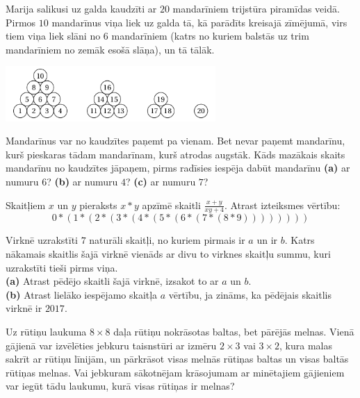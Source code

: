 \documentclass[11pt]{article}
\begin{document}
\begin{problem}[EE.PK.2011.7.TEST.10]
Marija salikusi uz galda kaudzīti ar $20$ mandarīniem trijstūra 
piramīdas veidā. Pirmos $10$ mandarīnus viņa liek uz galda tā, 
kā parādīts kreisajā zīmējumā, virs tiem viņa liek slāni no $6$ 
mandarīniem (katrs no kuriem balstās uz trim mandarīniem no zemāk
esošā slāņa), un tā tālāk. 
\begin{center}
\includegraphics[width=0.6\textwidth]{math-induction-junior-classes/EE-PK-2011-7-TEST-10.png}
\end{center}
Mandarīnus var no kaudzītes paņemt pa vienam. Bet nevar paņemt mandarīnu, kurš
pieskaras tādam mandarīnam, kurš atrodas augstāk. Kāds mazākais skaits mandarīnu 
no kaudzītes jāpaņem, pirms radīsies iespēja dabūt mandarīnu 
{\bf (a)} ar numuru $6$? 
{\bf (b)} ar numuru $4$? 
{\bf (c)} ar numuru $7$?
\end{problem}


\begin{problem}[EE.PK.2011.9.3]
Skaitļiem $x$ un $y$ pieraksts $x \ast y$ apzīmē skaitli 
${\displaystyle \frac{x+y}{xy+4}}$. Atrast izteiksmes vērtību:
$$0 \ast \left(  1 \ast \left( 2 \ast \left( 3 \ast \left(  
4 \ast \left( 5 \ast \left(  6 \ast \left( 
7 \ast \left( 8 \ast 9 \right)
\right) \right) \right)
\right) \right) \right) \right)$$
\end{problem}


\begin{problem}[EE.PK.2017.7.1]
Virknē uzrakstīti $7$ naturāli skaitļi, no kuriem pirmais 
ir $a$ un ir $b$. Katrs nākamais skaitlis šajā virknē vienāds 
ar divu to virknes skaitļu summu, kuri uzrakstīti tieši pirms viņa.\\
{\bf (a)} Atrast pēdējo skaitli šajā virknē, izsakot to ar $a$ un $b$.\\
{\bf (b)} Atrast lielāko iespējamo skaitļa $a$ vērtību, ja zināms, 
ka pēdējais skaitlis virknē ir $2017$.
\end{problem}


\begin{problem}[EE.PK.2017.9.4]
Uz rūtiņu laukuma $8 \times 8$ daļa rūtiņu nokrāsotas baltas, 
bet pārējās melnas. Vienā gājienā var izvēlēties jebkuru 
taisnstūri ar izmēru $2 \times 3$ vai $3 \times 2$, kura 
malas sakrīt ar rūtiņu līnijām, un pārkrāsot visas melnās rūtiņas
baltas un visas baltās rūtiņas melnas. Vai jebkuram sākotnējam krāsojumam 
ar minētajiem gājieniem var iegūt tādu laukumu, kurā 
visas rūtiņas ir melnas?
\end{problem}
\end{document}
